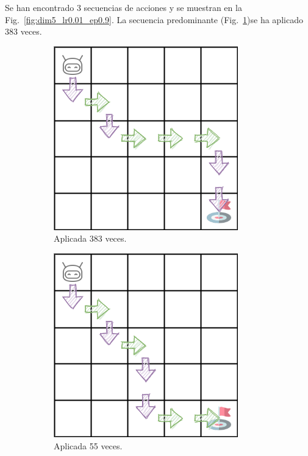 Se han encontrado 3 secuencias de acciones y se muestran en la Fig.~\ref{fig:dim5_lr0.01_ep0.9}. La secuencia predominante (Fig.~\ref{fig:dim5_lr0.01_ep0.9_383})se ha aplicado 383 veces. \\

\begin{figure}
    \centering
    \begin{subfigure}{.3\textwidth}
        \centering
        \includegraphics[scale=0.35]{cap5_experimentacion/images/dim5_lr0.01_ep0.9_383.png}
        \caption{Aplicada 383 veces.}
        \label{fig:dim5_lr0.01_ep0.9_383}
    \end{subfigure}%
    \begin{subfigure}{.3\textwidth}
        \centering
        \includegraphics[scale=0.35]{cap5_experimentacion/images/dim5_lr0.01_ep0.9_55.png}
        \caption{Aplicada 55 veces.}
        \label{fig:dim5_lr0.01_ep0.9_55}
    \end{subfigure}%
    \begin{subfigure}{.3\textwidth}
        \centering

\end{subfigure}
\end{figure}
